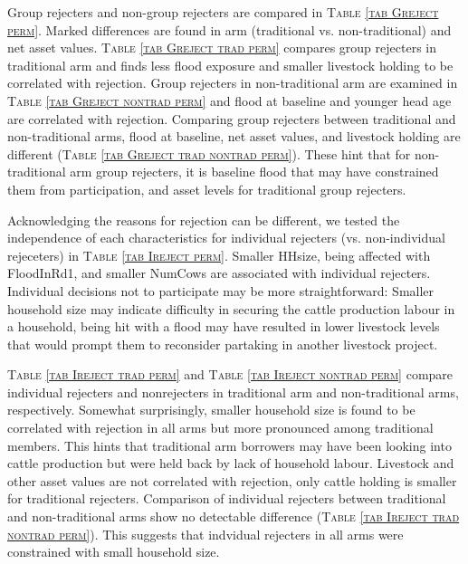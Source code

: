 	Group rejecters and non-group rejecters are compared in 	\textsc{\normalsize Table \ref{tab Greject perm}}. Marked differences are found in arm (\textsf{traditional} vs. non-\textsf{traditional}) and net asset values. \textsc{\normalsize Table \ref{tab Greject trad perm}} compares group rejecters in \textsf{traditional} arm and finds less flood exposure and smaller livestock holding to be correlated with rejection. Group rejecters in non-\textsf{traditional} arm are examined in \textsc{\normalsize Table \ref{tab Greject nontrad perm}} and flood at baseline and younger head age are correlated with rejection. Comparing group rejecters between \textsf{traditional} and non-\textsf{traditional} arms, flood at baseline, net asset values, and livestock holding are different (\textsc{\normalsize Table \ref{tab Greject trad nontrad perm}}). These hint that for non-\textsf{traditional} arm group rejecters, it is baseline flood that may have constrained them from participation, and asset levels for \textsf{traditional} group rejecters.
	
	Acknowledging the reasons for rejection can be different, we tested the independence of each characteristics for individual rejecters (vs. non-individual rejeceters) in \textsc{\normalsize Table \ref{tab Ireject perm}}. Smaller \textsf{HHsize}, being affected with \textsf{FloodInRd1}, and smaller \textsf{NumCows} are associated with individual rejecters. Individual decisions not to participate may be more straightforward: Smaller household size may indicate difficulty in securing the cattle production labour in a household, being hit with a flood may have resulted in lower livestock levels that would prompt them to reconsider partaking in another livestock project. 

	\textsc{\normalsize Table \ref{tab Ireject trad perm}} and \textsc{\normalsize Table \ref{tab Ireject nontrad perm}} compare individual rejecters and nonrejecters in \textsf{traditional} arm and non-\textsf{traditional} arms, respectively. Somewhat surprisingly, smaller household size is found to be correlated with rejection in all arms but more pronounced among \textsf{traditional} members. This hints that \textsf{traditional} arm borrowers may have been looking into cattle production but were held back by lack of household labour. Livestock and other asset values are not correlated with rejection, only cattle holding is smaller for \textsf{traditional} rejecters. Comparison of individual rejecters between \textsf{traditional} and non-\textsf{traditional} arms show no detectable difference (\textsc{\normalsize Table \ref{tab Ireject trad nontrad perm}}). This suggests that indvidual rejecters in all arms were constrained with small household size.

